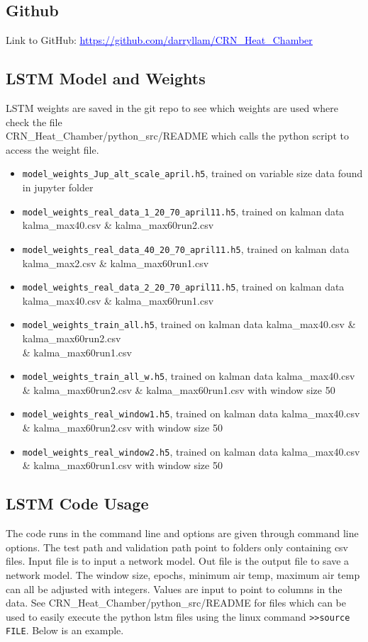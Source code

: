\subsection*{Github}
Link to GitHub: \href{https://github.com/darryllam/CRN_Heat_Chamber}{\textcolor{blue}{\underline{https://github.com/darryllam/CRN\_Heat\_Chamber}}}
\subsection*{LSTM Model and Weights}
LSTM weights are saved in the git repo to see which weights are used where check the file  \\ CRN\_Heat\_Chamber/python\_src/README which calls the python script to access the weight file.
\begin{itemize}
    \item \lstinline{model_weights_Jup_alt_scale_april.h5}, trained on variable size data found in jupyter folder
    \item \lstinline{model_weights_real_data_1_20_70_april11.h5}, trained on kalman data kalma\_max40.csv \& kalma\_max60run2.csv 
    \item \lstinline{model_weights_real_data_40_20_70_april11.h5}, trained on kalman data kalma\_max2.csv \& kalma\_max60run1.csv 
     \item \lstinline{model_weights_real_data_2_20_70_april11.h5}, trained on kalman data kalma\_max40.csv \& kalma\_max60run1.csv
     \item \lstinline{model_weights_train_all.h5}, trained on kalman data kalma\_max40.csv \& kalma\_max60run2.csv\\ \& kalma\_max60run1.csv
    \item \lstinline{model_weights_train_all_w.h5}, trained on kalman data kalma\_max40.csv \& kalma\_max60run2.csv \& kalma\_max60run1.csv with window size 50
    \item \lstinline{model_weights_real_window1.h5}, trained on kalman data kalma\_max40.csv \& kalma\_max60run2.csv with window size 50
    \item \lstinline{model_weights_real_window2.h5}, trained on kalman data kalma\_max40.csv \& kalma\_max60run1.csv with window size 50
\end{itemize}
\subsection*{LSTM Code Usage}
The code runs in the command line and options are given through command line options. The test path and validation path point to folders only containing csv files. Input file is to input a network model. Out file is the output file to save a network model. The window size, epochs, minimum air temp, maximum air temp can all be adjusted with integers. Values are input to point to columns in the data. See CRN\_Heat\_Chamber/python\_src/README for files which can be used to easily execute the python lstm files using the linux command \lstinline{>>source FILE}. Below is an example.\\
\ttfamily

